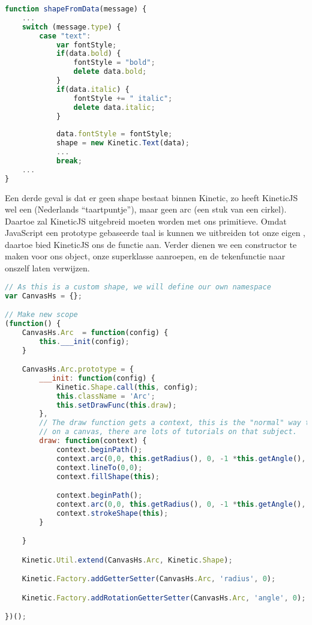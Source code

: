 \begin{lstlisting}[language=JavaScript]
function shapeFromData(message) {
	...
	switch (message.type) {
		case "text":
			var fontStyle;
			if(data.bold) {
				fontStyle = "bold";
				delete data.bold;
			}
			if(data.italic) {
				fontStyle += " italic";
				delete data.italic;
			}
			
			data.fontStyle = fontStyle;
			shape = new Kinetic.Text(data);
			...
			break;
	...
}
\end{lstlisting}

Een derde geval is dat er geen shape bestaat binnen Kinetic, zo heeft KineticJS wel een  (Nederlands ``taartpuntje''), maar geen arc (een stuk van een cirkel). Daartoe zal KineticJS uitgebreid moeten worden met ons primitieve. Omdat JavaScript een prototype gebaseerde taal is kunnen we  uitbreiden tot onze eigen , daartoe bied KineticJS ons de  functie aan. Verder dienen we een constructor te maken voor ons object, onze superklasse aanroepen, en de tekenfunctie naar onszelf laten verwijzen.

\begin{lstlisting}[style=densecode, language=JavaScript]
// As this is a custom shape, we will define our own namespace
var CanvasHs = {};

// Make new scope
(function() {
    CanvasHs.Arc  = function(config) {
        this.___init(config);
    }

    CanvasHs.Arc.prototype = {
        ___init: function(config) {
            Kinetic.Shape.call(this, config);
            this.className = 'Arc';
            this.setDrawFunc(this.draw);
        },
        // The draw function gets a context, this is the "normal" way to draw
        // on a canvas, there are lots of tutorials on that subject.
        draw: function(context) {
            context.beginPath();
            context.arc(0,0, this.getRadius(), 0, -1 *this.getAngle(), true);
            context.lineTo(0,0);
            context.fillShape(this);

            context.beginPath();
            context.arc(0,0, this.getRadius(), 0, -1 *this.getAngle(), true);
            context.strokeShape(this);
        }

    }

    Kinetic.Util.extend(CanvasHs.Arc, Kinetic.Shape);

    Kinetic.Factory.addGetterSetter(CanvasHs.Arc, 'radius', 0);

    Kinetic.Factory.addRotationGetterSetter(CanvasHs.Arc, 'angle', 0);

})();
\end{lstlisting}

